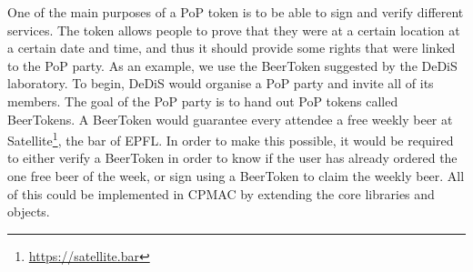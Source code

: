 \begin{description}[style=nextline]
\item[Sign and Verify Services] One of the main purposes of a PoP token is to be able to sign and verify different services. The token allows people to prove that they were at a certain location at a certain date and time, and thus it should provide some rights that were linked to the PoP party. As an example, we use the BeerToken suggested by the DeDiS laboratory. To begin, DeDiS would organise a PoP party and invite all of its members. The goal of the PoP party is to hand out PoP tokens called BeerTokens. A BeerToken would guarantee every attendee a free weekly beer at Satellite\footnote{\url{https://satellite.bar}}, the bar of EPFL. In order to make this possible, it would be required to either verify a BeerToken in order to know if the user has already ordered the one free beer of the week, or sign using a BeerToken to claim the weekly beer. All of this could be implemented in CPMAC by extending the core libraries and objects.
\end{description}
